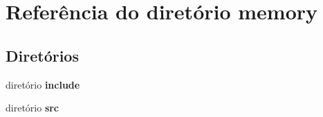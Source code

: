 \section{Referência do diretório memory}
\label{dir_267116d250309cbe7bd39c0026ee016a}
\subsection*{Diretórios}
\begin{DoxyCompactItemize}
\item 
diretório \textbf{ include}
\item 
diretório \textbf{ src}
\end{DoxyCompactItemize}
